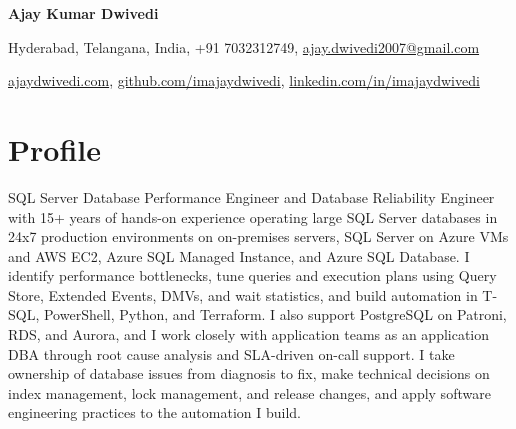 \documentclass[10pt,a4paper]{article}
\begin{document}
\begin{center}
{\Huge\bfseries Ajay Kumar Dwivedi}

\vspace{6pt}
Hyderabad, Telangana, India, +91 7032312749, \href{mailto:ajay.dwivedi2007@gmail.com}{ajay.dwivedi2007@gmail.com}

\vspace{2pt}
\href{https://ajaydwivedi.com/}{ajaydwivedi.com}, \href{https://github.com/imajaydwivedi}{github.com/imajaydwivedi}, \href{https://linkedin.com/in/imajaydwivedi/}{linkedin.com/in/imajaydwivedi}
\end{center}

\section{Profile}
SQL Server Database Performance Engineer and Database Reliability Engineer with 15+ years of hands-on experience operating large SQL Server databases in 24x7 production environments on on-premises servers, SQL Server on Azure VMs and AWS EC2, Azure SQL Managed Instance, and Azure SQL Database. I identify performance bottlenecks, tune queries and execution plans using Query Store, Extended Events, DMVs, and wait statistics, and build automation in T-SQL, PowerShell, Python, and Terraform. I also support PostgreSQL on Patroni, RDS, and Aurora, and I work closely with application teams as an application DBA through root cause analysis and SLA-driven on-call support. I take ownership of database issues from diagnosis to fix, make technical decisions on index management, lock management, and release changes, and apply software engineering practices to the automation I build.
\end{document}
